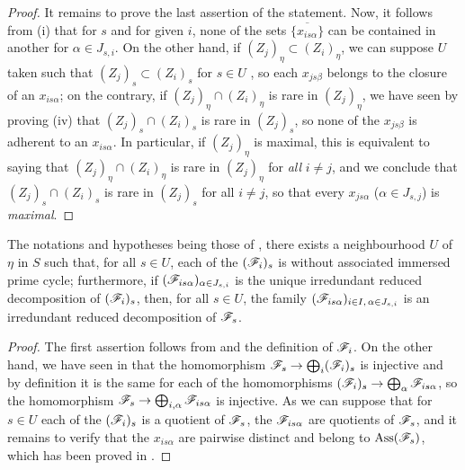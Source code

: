 \begin{proof}
It remains to prove the last assertion of the statement.
Now, it follows from (i) that for $s$ and for given $i$, none of the sets $\overline{\{x_{is\alpha}\}}$ can be contained in another for $\alpha\in J_{s,i}$.
On the other hand, if $(Z_j)_\eta\subset(Z_i)_\eta$, we can suppose $U$ taken such that $(Z_j)_s\subset(Z_i)_s$ for $s\in U$ , so each $x_{js\beta}$ belongs to the closure of an $x_{is\alpha}$; on the contrary, if $(Z_j)_\eta\cap(Z_i)_\eta$ is rare in $(Z_j)_\eta$, we have seen by proving (iv) that $(Z_j)_s\cap(Z_i)_s$ is rare in $(Z_j)_s$, so none of the $x_{js\beta}$ is adherent to an $x_{is\alpha}$.
In particular, if $(Z_j)_\eta$ is maximal, this is equivalent to saying that $(Z_j)_\eta\cap(Z_i)_\eta$ is rare in $(Z_j)_\eta$ for \emph{all} $i\neq j$, and we conclude that $(Z_j)_s\cap(Z_i)_s$ is rare in $(Z_j)_s$ for all $i\neq j$, so that every $x_{js\alpha}$ ($\alpha\in J_{s,j}$) is \emph{maximal}.
\end{proof}

\begin{corollary}[9.8.4]
\label{IV.9.8.4}
The notations and hypotheses being those of \emph{}, there exists a neighbourhood $U$ of $\eta$ in $S$ such that, for all $s\in U$, each of the $(\mathscr{F}_i)_s$ is without associated immersed prime cycle; furthermore, if $(\mathscr{F}_{is\alpha})_{\alpha\in J_{s,i}}$ is the unique irredundant reduced decomposition of $(\mathscr{F}_i)_s$, then, for all $s\in U$, the family $(\mathscr{F}_{is\alpha})_{i\in I,\,\alpha\in J_{s,i}}$ is an irredundant reduced decomposition of $\mathscr{F}_s$.
\end{corollary}

\begin{proof}
\label{IV.9.8.4-proof}
The first assertion follows from  and the definition of $\mathscr{F}_i$.
On the other hand, we have seen in  that the homomorphism $\mathscr{F}_s\to\bigoplus_i(\mathscr{F}_i)_s$ is injective and by definition it is the same for each of the homomorphisms $(\mathscr{F}_i)_s\to\bigoplus_\alpha\mathscr{F}_{is\alpha}$, so the homomorphism $\mathscr{F}_s\to\bigoplus_{i,\alpha}\mathscr{F}_{is\alpha}$ is injective.
As we can suppose  that for $s\in U$ each of the $(\mathscr{F}_i)_s$ is a quotient of $\mathscr{F}_s$, the $\mathscr{F}_{is\alpha}$ are quotients of $\mathscr{F}_s$, and it remains to verify  that the $x_{is\alpha}$ are pairwise distinct and belong to $\operatorname{Ass}(\mathscr{F}_s)$, which has been proved in .
\end{proof}


